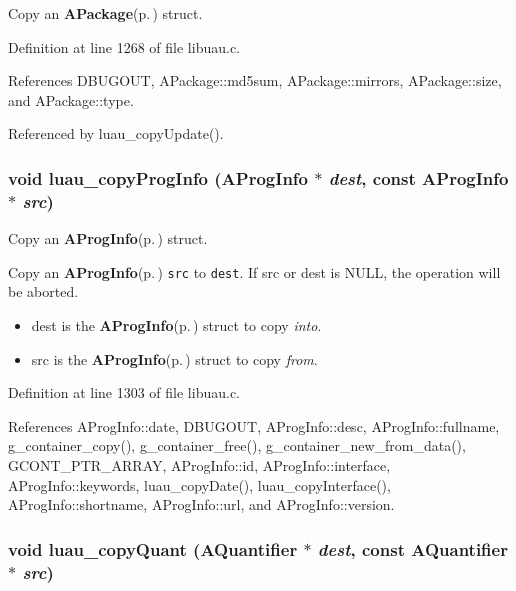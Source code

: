 Copy an {\bf APackage}{\rm (p.\,\pageref{structAPackage})} struct. 



Definition at line 1268 of file libuau.c.

References DBUGOUT, APackage::md5sum, APackage::mirrors, APackage::size, and APackage::type.

Referenced by luau\_\-copy\-Update().
\subsubsection{\setlength{\rightskip}{0pt plus 5cm}void luau\_\-copy\-Prog\-Info ({\bf AProg\-Info} $\ast$ {\em dest}, const {\bf AProg\-Info} $\ast$ {\em src})}\label{libuau_8c_a45}


Copy an {\bf AProg\-Info}{\rm (p.\,\pageref{structAProgInfo})} struct. 

Copy an {\bf AProg\-Info}{\rm (p.\,\pageref{structAProgInfo})} {\tt src} to {\tt dest}. If src or dest is NULL, the operation will be aborted.

\begin{itemize}
\item dest is the {\bf AProg\-Info}{\rm (p.\,\pageref{structAProgInfo})} struct to copy {\em into\/}. \item src is the {\bf AProg\-Info}{\rm (p.\,\pageref{structAProgInfo})} struct to copy {\em from\/}. \end{itemize}


Definition at line 1303 of file libuau.c.

References AProg\-Info::date, DBUGOUT, AProg\-Info::desc, AProg\-Info::fullname, g\_\-container\_\-copy(), g\_\-container\_\-free(), g\_\-container\_\-new\_\-from\_\-data(), GCONT\_\-PTR\_\-ARRAY, AProg\-Info::id, AProg\-Info::interface, AProg\-Info::keywords, luau\_\-copy\-Date(), luau\_\-copy\-Interface(), AProg\-Info::shortname, AProg\-Info::url, and AProg\-Info::version.
\subsubsection{\setlength{\rightskip}{0pt plus 5cm}void luau\_\-copy\-Quant ({\bf AQuantifier} $\ast$ {\em dest}, const {\bf AQuantifier} $\ast$ {\em src})}\label{libuau_8c_a49}


